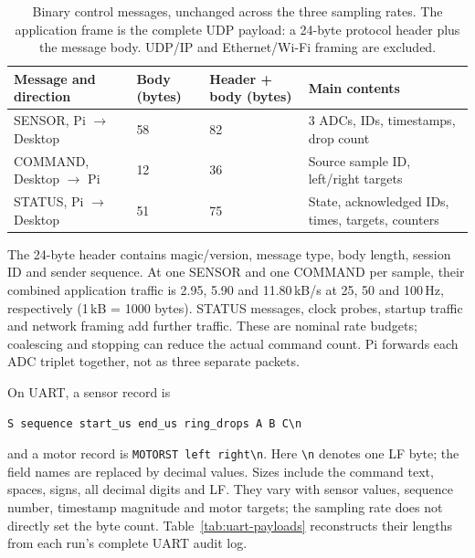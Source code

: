 \begin{table}[H]
\centering\small
\caption{Binary control messages, unchanged across the three sampling rates. The application frame is the complete UDP payload: a 24-byte protocol header plus the message body. UDP/IP and Ethernet/Wi-Fi framing are excluded.}
\label{tab:control-payloads}
\begin{tabular}{@{}llll@{}}
\toprule
Message and direction & Body (bytes) & Header + body (bytes) & Main contents \\
\midrule
SENSOR, Pi $\to$ Desktop & 58 & 82 & 3 ADCs, IDs, timestamps, drop count \\
COMMAND, Desktop $\to$ Pi & 12 & 36 & Source sample ID, left/right targets \\
STATUS, Pi $\to$ Desktop & 51 & 75 & State, acknowledged IDs, times, targets, counters \\
\bottomrule
\end{tabular}
\end{table}

The 24-byte header contains magic/version, message type, body length, session ID and sender sequence. At one SENSOR and one COMMAND per sample, their combined application traffic is 2.95, 5.90 and 11.80\,kB/s at 25, 50 and 100\,Hz, respectively (1\,kB = 1000 bytes). STATUS messages, clock probes, startup traffic and network framing add further traffic. These are nominal rate budgets; coalescing and stopping can reduce the actual command count. Pi forwards each ADC triplet together, not as three separate packets.

On UART, a sensor record is
\begin{verbatim}
S sequence start_us end_us ring_drops A B C\n
\end{verbatim}
and a motor record is \texttt{MOTORST left right\textbackslash n}. Here \texttt{\textbackslash n} denotes one LF byte; the field names are replaced by decimal values. Sizes include the command text, spaces, signs, all decimal digits and LF. They vary with sensor values, sequence number, timestamp magnitude and motor targets; the sampling rate does not directly set the byte count. Table~\ref{tab:uart-payloads} reconstructs their lengths from each run's complete UART audit log.

\begin{table}[H]
\centering\small
\caption{Unpadded UART records at 115200 baud, 8N1. Rate is in Hz; byte counts are median [minimum--maximum], including LF. Wire time is calculated for the median length, not measured end-to-end latency. Counts include all logged sensor records and dispatched motor commands, so they differ from matched timing-cycle counts.}
\label{tab:uart-payloads}

\end{table}

